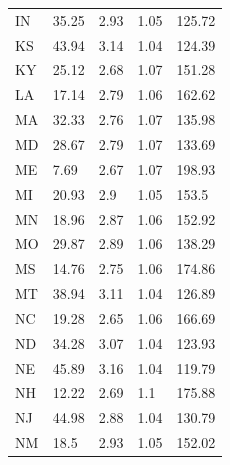 \documentclass[Afour,sageh,times]{sagej}
\begin{document}
\begin{table}
\begin{tabular}{p{1in}p{1in}p{1in}p{1in}p{1in}}
	IN    & 35.25                       & 2.93                 & 1.05         & 125.72                    \\
	KS    & 43.94                       & 3.14                 & 1.04         & 124.39                    \\
	KY    & 25.12                       & 2.68                 & 1.07         & 151.28                    \\
	LA    & 17.14                       & 2.79                 & 1.06         & 162.62                    \\
	MA    & 32.33                       & 2.76                 & 1.07         & 135.98                    \\
	MD    & 28.67                       & 2.79                 & 1.07         & 133.69                    \\
	ME    & 7.69                        & 2.67                 & 1.07         & 198.93                    \\
	MI    & 20.93                       & 2.9                  & 1.05         & 153.5                     \\
	MN    & 18.96                       & 2.87                 & 1.06         & 152.92                    \\
	MO    & 29.87                       & 2.89                 & 1.06         & 138.29                    \\
	MS    & 14.76                       & 2.75                 & 1.06         & 174.86                    \\
	MT    & 38.94                       & 3.11                 & 1.04         & 126.89                    \\
	NC    & 19.28                       & 2.65                 & 1.06         & 166.69                    \\
	ND    & 34.28                       & 3.07                 & 1.04         & 123.93                    \\
	NE    & 45.89                       & 3.16                 & 1.04         & 119.79                    \\
	NH    & 12.22                       & 2.69                 & 1.1          & 175.88                    \\
	NJ    & 44.98                       & 2.88                 & 1.04         & 130.79                    \\
	NM    & 18.5                        & 2.93                 & 1.05         & 152.02                    \\

\end{tabular}
\end{table}
\end{document}
